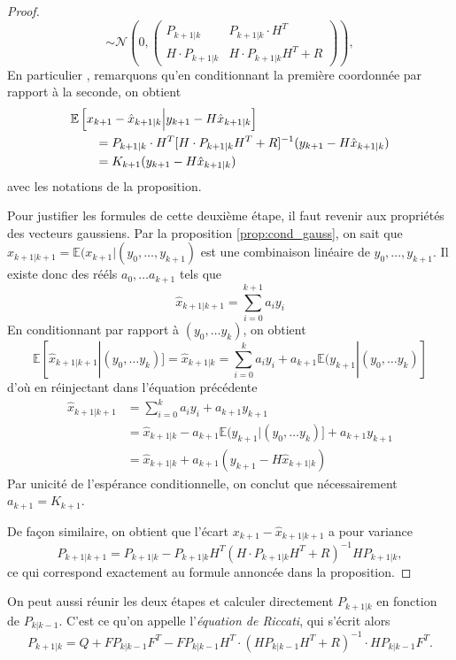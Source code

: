 \documentclass[a4paper,12pt]{book}
\newcommand{\E}{\mathbb{E}}
\begin{document}
\begin{proof}
\[\sim \mathcal{N} \left( 0,\begin{pmatrix}
P_{k+1|k}& P_{k+1|k}\cdot H^T\\
H\cdot P_{k+1|k}& H\cdot P_{k+1|k}H^T+R
\end{pmatrix}\right),
\]
En particulier , remarquons qu'en conditionnant la première coordonnée par rapport à la seconde, on obtient
\begin{align*}
& \E\left[ x_{k+1}-\hat{x}_{k+1|k}\Bigl|y_{k+1}-H\hat{x}_{k+1|k}\right] \\
&\qquad=   P_{k+1|k}\cdot H^T [H\cdot P_{k+1|k}H^T+R]^{-1} (y_{k+1}-H\hat{x}_{k+1|k}) \\
&\qquad=   K_{k+1}(y_{k+1}-H\hat{x}_{k+1|k})
\end{align*}
avec les notations de la proposition.

Pour justifier les formules de cette deuxième étape, il faut revenir aux propriétés des vecteurs gaussiens. Par la proposition \ref{prop:cond_gauss}, on sait que $\hat{x}_{k+1|k+1} = \E(x_{k+1}|(y_0,\ldots,y_{k+1})$ est une combinaison linéaire de $y_0,\ldots, y_{k+1}$. Il existe donc des rééls $a_0,\ldots a_{k+1}$ tels que
\[ \hat{x}_{k+1|k+1}= \sum_{i=0}^{k+1} a_iy_i\]
En conditionnant par rapport à $(y_0,\ldots y_k)$, on obtient
\[ \E[\hat{x}_{k+1|k+1}|(y_0,\ldots y_k) ] = \hat{x}_{k+1|k}= \sum_{i=0}^{k} a_iy_i + a_{k+1} \E(y_{k+1} |(y_0,\ldots y_k)]\]
d'où en réinjectant dans l'équation précédente
\begin{align*}
\hat{x}_{k+1|k+1}&= \sum_{i=0}^{k} a_iy_i +a_{k+1}y_{k+1}\\
&=\hat{x}_{k+1|k}-a_{k+1} \E(y_{k+1} |(y_0,\ldots y_k)] +a_{k+1}y_{k+1}\\
&= \hat{x}_{k+1|k} +a_{k+1} (y_{k+1} -H\hat{x}_{k+1|k})
\end{align*}
Par unicité de l'espérance conditionnelle, on conclut que nécessairement $a_{k+1}  = K_{k+1}$.


De façon similaire, on obtient que l'écart $x_{k+1}- \hat{x}_{k+1|k+1}$ a pour variance
$$P_{k+1|k+1}=P_{k+1|k} -P_{k+1|k}H^T(H\cdot P_{k+1|k}H^T+R)^{-1}HP_{k+1|k} ,$$
ce qui correspond exactement au formule annoncée dans la proposition.
\end{proof}

On peut aussi réunir les deux étapes et calculer directement $P_{k+1|k}$ en fonction de $P_{k|k-1}$. C'est ce qu'on appelle l'\emph{équation de Riccati}, qui s'écrit alors
$$P_{k+1|k}=Q+FP_{k|k-1}F^T-FP_{k|k-1}H^T\cdot \left(HP_{k|k-1}H^T+R\right)^{-1}\cdot H P_{k|k-1} F^T. $$
\end{document}
